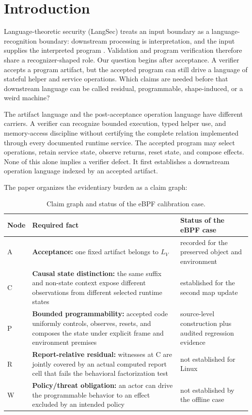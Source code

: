 \documentclass[conference]{IEEEtran}
\begin{document}
\section{Introduction}

Language-theoretic security (LangSec) treats an input boundary as a language-recognition boundary: downstream processing is interpretation, and the input supplies the interpreted program \cite{ref1,ref2,ref3,ref4}. Validation and program verification therefore share a recognizer-shaped role. Our question begins after acceptance. A verifier accepts a program artifact, but the accepted program can still drive a language of stateful helper and service operations. Which claims are needed before that downstream language can be called residual, programmable, shape-induced, or a weird machine?

The artifact language and the post-acceptance operation language have different carriers. A verifier can recognize bounded execution, typed helper use, and memory-access discipline without certifying the complete relation implemented through every documented runtime service. The accepted program may select operations, retain service state, observe returns, reset state, and compose effects. None of this alone implies a verifier defect. It first establishes a downstream operation language indexed by an accepted artifact.

The paper organizes the evidentiary burden as a claim graph:

\begin{table}[t]
\caption{Claim graph and status of the eBPF calibration case.}
\label{tab:claim-graph}
\centering
\begin{tabularx}{\textwidth}{@{}p{}p{}Y@{}}
\toprule
Node & Required fact & Status of the eBPF case \\
\midrule
A & \textbf{Acceptance:} one fixed artifact belongs to $L_V$ & recorded for the preserved object and environment \\
C & \textbf{Causal state distinction:} the same suffix and non-state context expose different observations from different selected runtime states & established for the second map update \\
P & \textbf{Bounded programmability:} accepted code uniformly controls, observes, resets, and composes the state under explicit frame and environment premises & source-level construction plus audited regression evidence \\
R & \textbf{Report-relative residual:} witnesses at C are jointly covered by an actual computed report cell that fails the behavioral factorization test & not established for Linux \\
W & \textbf{Policy/threat obligation:} an actor can drive the programmable behavior to an effect excluded by an intended policy & not established by the offline case \\
\bottomrule
\end{tabularx}
\end{table}
\end{document}
